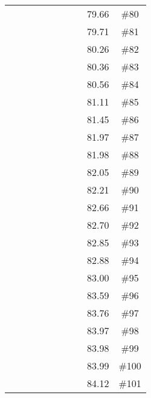 \begin{longtable}{|c|c|c|c|c|c|c|c|c|c|}
 \x    & \x    &       &       & \x    & \x    &       &       & 79.66 & \#80 \\
 \x    & \x    & \x    &       & \x    & \x    & \x\m  &       & 79.71 & \#81 \\
 \x    & \x    & \x    & \x    &       &       & \x    &       & 80.26 & \#82 \\
 \x    & \x    & \x    &       &       &       & \x    &       & 80.36 & \#83 \\
 \x    & \x    & \x    &       & \x\m  &       &       & \x    & 80.56 & \#84 \\
 \x    & \x    & \x    & \x    &       &       &       & \x    & 81.11 & \#85 \\
 \x    & \x    & \x    &       &       & \x    & \x    &       & 81.45 & \#86 \\
 \x    & \x    & \x    &       &       & \x\m  &       & \x\m  & 81.97 & \#87 \\
 \x    & \x    & \x    & \x    &       & \x\m  &       & \x\m  & 81.98 & \#88 \\
 \x    & \x    & \x    &       & \x\m  &       &       &       & 82.05 & \#89 \\
 \x    & \x    &       &       &       &       &       &       & 82.21 & \#90 \\
 \x    & \x    & \x    & \x    &       & \x    &       & \x    & 82.66 & \#91 \\
 \x    & \x    &       & \x    & \x    & \x    &       &       & 82.70 & \#92 \\
 \x    & \x    & \x    & \x    &       & \x\m  & \x\m  &       & 82.85 & \#93 \\
 \x    & \x    &       &       & \x    & \x    &       & \x    & 82.88 & \#94 \\
 \x    & \x    &       &       & \x    &       &       & \x    & 83.00 & \#95 \\
 \x    & \x    & \x    &       &       & \x    & \x\m  &       & 83.59 & \#96 \\
 \x    & \x    & \x    & \x    & \x    &       & \x\m  &       & 83.76 & \#97 \\
 \x    & \x    &       &       & \x    & \x    & \x    &       & 83.97 & \#98 \\
 \x    & \x    &       & \x    &       & \x    &       &       & 83.98 & \#99 \\
 \x    & \x    & \x    &       &       &       & \x\m  &       & 83.99 & \#100 \\
 \x    & \x    & \x    & \x    & \x    & \x\m  & \x\m  &       & 84.12 & \#101 \\

\end{longtable}

